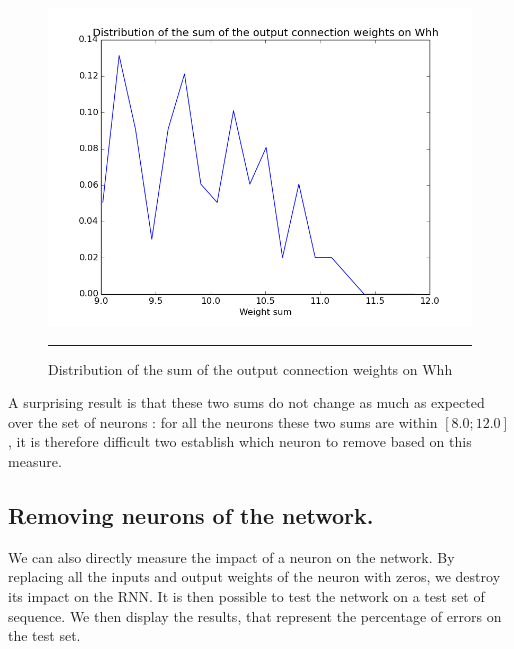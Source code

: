 \begin{figure}[htbp]
    \centering
    \includegraphics[scale=0.4]{Figures/output_sum_weight_distribution.png}
    \rule{35em}{0.5pt}
    \caption[Distribution of the sum of the output connection weights on Whh]{Distribution of the sum of the output connection weights on Whh}
    \label{fig:output_sum}
\end{figure}

A surprising result is that these two sums do not change as much as expected over the set of neurons : for all the neurons these two sums are within $[8.0; 12.0]$, it is therefore difficult two establish which neuron to remove based on this measure.

\subsection{Removing neurons of the network.}

We can also directly measure the impact of a neuron on the network. By replacing all the inputs and output weights of the neuron with zeros, we destroy its impact on the RNN. It is then possible to test the network on a test set of sequence. We then display the results, that represent the percentage of errors on the test set. 

